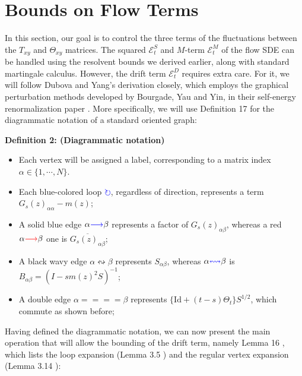 \documentclass[11pt]{article}
\newenvironment{boxt}[1]
  {\begin{mdframed}\noindent\textbf{#1}\normalfont\space}
  {\end{mdframed}}
\begin{document}
\newpage
\section{Bounds on Flow Terms}
\label{sec:drift}
In this section, our goal is to control the three terms of the fluctuations between the $T_{xy}$ and $\Theta_{xy}$ matrices. The squared $\mathcal{E}_t^S$ and $M$-term $\mathcal{E}_t^M$ of the flow SDE can be handled using the resolvent bounds we derived earlier, along with standard martingale calculus. However, the drift term $\mathcal{E}^{D}_t$ requires extra care. For it, we will follow Dubova and Yang's derivation closely, which employs the graphical perturbation methods developed by Bourgade, Yau and Yin, in their self-energy renormalization paper \cite{38}. More specifically, we will use Definition 17  \cite{bandSDE} for the diagrammatic notation of a standard oriented graph:
\vspace{0.25 cm}
\begin{boxt}{Definition 2: (Diagrammatic notation)}\label{def2}
\begin{itemize}
\item Each vertex will be assigned a label, corresponding to a matrix index $\alpha \in \{1, \cdots, N\}$. 
\item Each blue-colored loop \textcolor{blue}{$\circlearrowright$}, regardless of direction, represents a term $G_s(z)_{\alpha\alpha} - m(z)$;
\item A solid blue edge  $\alpha\textcolor{blue}{\longrightarrow}\beta$ represents a factor of $G_s(z)_{\alpha\beta}$, whereas a red $\alpha\textcolor{red}{\longrightarrow}\beta$ one is $\overline{G_s(z)_{\alpha\beta}}$;
\item A black wavy edge $\alpha\leftrightsquigarrow \beta$ represents $S_{\alpha\beta}$, whereas $\alpha\textcolor{blue}{\leftrightsquigarrow} \beta$ is $B_{\alpha\beta} = (I-sm(z)^2S)^{-1}$; 
\item A double edge $\alpha =\!=\!=\!=\beta$ represents $\{\text{Id}+(t-s)\Theta_t\}S^{1/2}$, which commute as shown before;
\end{itemize}
\end{boxt}
Having defined the diagrammatic notation, we can now present the main operation that will allow the bounding of the drift term, namely Lemma 16 \cite{bandSDE}, which lists the loop expansion (Lemma 3.5 \cite{38}) and the regular vertex expansion (Lemma 3.14 \cite{38}): 
\end{document}
